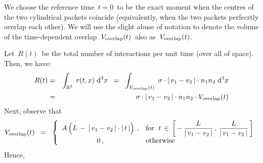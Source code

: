 \proof
We choose the reference time
\,$t = 0$\,
to be the exact moment when the centres of the two cylindrical packets coincide
(equivalently, when the two packets perfecrtly overlap each other).
We will use the slight abuse of notation to denote the volume
of the time-dependent overlap
\,$V_{\textnormal{overlap}}(t)$\,
also as
\,$V_{\textnormal{overlap}}(t)$.\,

\vskip 0.3cm
\noindent
Let
\,$R(t)$\,
be the total number of interactions per unit time (over all of space).
Then, we have:
\begin{eqnarray*}
R(t)
& = &
    \int_{\mathbb{R}^{3}}\;
        r(t,x)
        \;\textnormal{d}^{3}x
\;\; = \;\;
    \int_{V_{\textnormal{overlap}}(t)}\;
        \sigma \cdot \vert\,v_{1} - v_{2}\,\vert \cdot n_{1} n_{2}
        \;\textnormal{d}^{3}x
\\
& = &
    \sigma \cdot \vert\,v_{1} - v_{2}\,\vert \cdot n_{1} n_{2} \cdot V_{\textnormal{overlap}}(t)
\end{eqnarray*}
Next, observe that
\begin{equation*}
V_{\textnormal{overlap}}(t)
\;\; = \;\;
    \left\{\begin{array}{cl}
        A\left(L \,\overset{{\color{white}.}}{-}\, \vert\,v_{1}-v_{2}\,\vert\cdot\vert\,t\,\vert\right)\,, & \textnormal{for \;$t \,\in\, \left[\,-\,\dfrac{L}{\vert\,v_{1}-v_{2}\,\vert}\,,\,\dfrac{L}{\vert\,v_{1}-v_{2}\,\vert}\,\right]$}
        \\
        0\,, & \textnormal{otherwise}
        \end{array}\right.
\end{equation*}
Hence,
